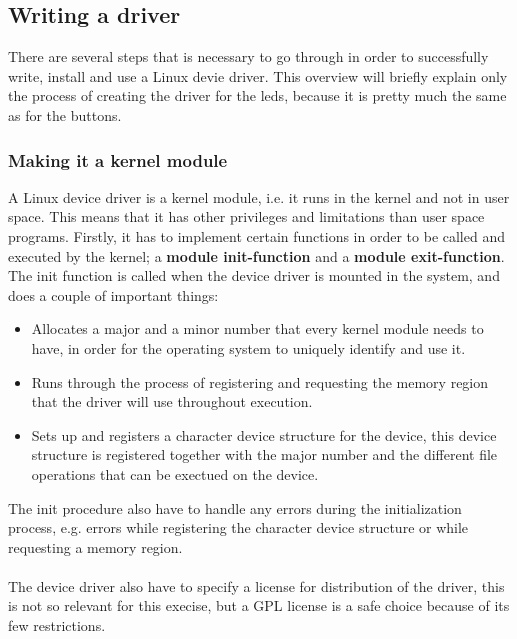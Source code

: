 \subsection{Writing a driver}
There are several steps that is necessary to go through in order
to successfully write, install and use a Linux devie driver. This
overview will briefly explain only the process of creating the driver
for the leds, because it is pretty much the same as for the buttons.

\subsubsection{Making it a kernel module}
A Linux device driver is a kernel module, i.e. it runs in the kernel and
not in user space. This means that it has other privileges and
limitations than user space programs. Firstly, it has to implement
certain functions in order to be called and executed by the kernel;
a \textbf{module init-function} and a \textbf{module exit-function}.
The init function is called when the device driver is mounted in the
system, and does a couple of important things:

\begin{itemize}
	\item	Allocates a major and a minor number that every
			kernel module needs to have, in order for the
			operating system to uniquely identify and use it.
	\item	Runs through the process of registering and
			requesting the memory region
			that the driver will use throughout execution.
	\item	Sets up and registers a character device structure
			for the device, this device structure is registered
			together with the major number and the different
			file operations that can be exectued on the device.
\end{itemize}
The init procedure also have to handle any errors during the
initialization process, e.g. errors while registering the
character device structure or while requesting a memory region.\\
\\
The device driver also have to specify a license for distribution of
the driver, this is not so relevant for this execise, but a GPL license
is a safe choice because of its few restrictions.

